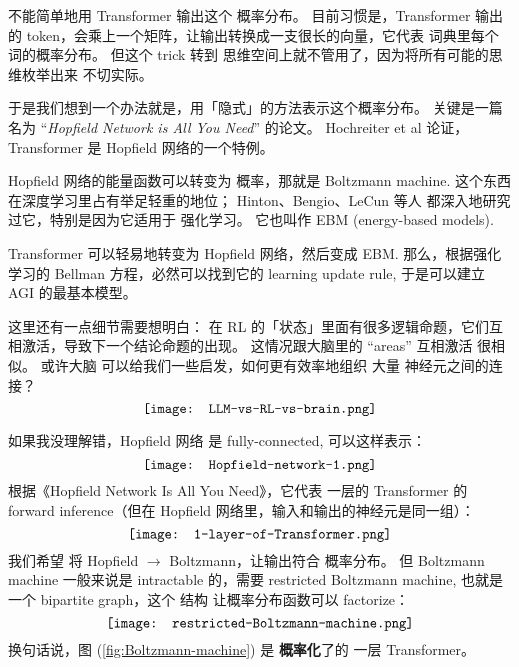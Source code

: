 \begin{preview}
\begin{minipage}{\textwidth}
不能简单地用 Transformer 输出这个 概率分布。 目前习惯是，Transformer 输出的 token，会乘上一个矩阵，让输出转换成一支很长的向量，它代表 词典里每个词的概率分布。 但这个 trick 转到 思维空间上就不管用了，因为将所有可能的思维枚举出来 不切实际。

于是我们想到一个办法就是，用「隐式」的方法表示这个概率分布。 关键是一篇名为 “\textit{Hopfield Network is All You Need}” 的论文。 Hochreiter et al 论证，Transformer 是 Hopfield 网络的一个特例。

Hopfield 网络的能量函数可以转变为 概率，那就是 Boltzmann machine.  这个东西在深度学习里占有举足轻重的地位； Hinton、Bengio、LeCun 等人 都深入地研究过它，特别是因为它适用于 强化学习。 它也叫作 EBM (energy-based models).

Transformer 可以轻易地转变为 Hopfield 网络，然后变成 EBM.  那么，根据强化学习的 Bellman 方程，必然可以找到它的 learning update rule, 于是可以建立 AGI 的最基本模型。

这里还有一点细节需要想明白： 在 RL 的「状态」里面有很多逻辑命题，它们互相激活，导致下一个结论命题的出现。 这情况跟大脑里的 ``areas'' 互相激活 很相似。 或许大脑 可以给我们一些启发，如何更有效率地组织 大量 神经元之间的连接？
\begin{equation}
\vcenter{\hbox{\texttt{[image: LLM-vs-RL-vs-brain.png]}}}
\end{equation}

如果我没理解错，Hopfield 网络 是 fully-connected, 可以这样表示：
\begin{equation}
	\vcenter{\hbox{\texttt{[image: Hopfield-network-1.png]}}}
\end{equation}
根据《Hopfield Network Is All You Need》，它代表 一层的 Transformer 的 forward inference（但在 Hopfield 网络里，输入和输出的神经元是同一组）：
\begin{equation}
	\vcenter{\hbox{\texttt{[image: 1-layer-of-Transformer.png]}}}
\end{equation}
我们希望 将 Hopfield $\rightarrow$ Boltzmann，让输出符合 概率分布。 但 Boltzmann machine 一般来说是 intractable 的，需要 restricted Boltzmann machine, 也就是一个 bipartite graph，这个 结构 让概率分布函数可以 factorize：
\begin{equation}
\vcenter{\hbox{\texttt{[image: restricted-Boltzmann-machine.png]}}}
\label{fig:Boltzmann-machine}
\end{equation}
换句话说，图 (\ref{fig:Boltzmann-machine}) 是 \textbf{概率化}了的 一层 Transformer。


\end{minipage}
\end{preview}

